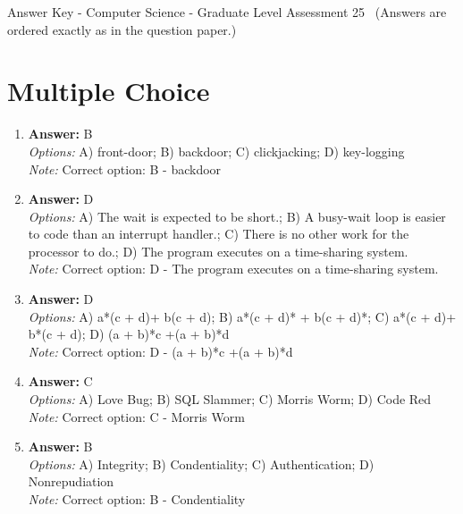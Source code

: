 \documentclass[12pt]{article}
\begin{document}
\begin{center}
Answer Key - Computer Science - Graduate Level Assessment 25 \
\small (Answers are ordered exactly as in the question paper.)
\end{center}

\section*{Multiple Choice}
\begin{enumerate}[label=\arabic*.]
\item \textbf{Answer:} B
\\ \textit{Options:} A) front-door; B) backdoor; C) clickjacking; D) key-logging
\\ \textit{Note:} Correct option: B - backdoor
\item \textbf{Answer:} D
\\ \textit{Options:} A) The wait is expected to be short.; B) A busy-wait loop is easier to code than an interrupt handler.; C) There is no other work for the processor to do.; D) The program executes on a time-sharing system.
\\ \textit{Note:} Correct option: D - The program executes on a time-sharing system.
\item \textbf{Answer:} D
\\ \textit{Options:} A) a*(c + d)+ b(c + d); B) a*(c + d)* + b(c + d)*; C) a*(c + d)+ b*(c + d); D) (a + b)*c +(a + b)*d
\\ \textit{Note:} Correct option: D - (a + b)*c +(a + b)*d
\item \textbf{Answer:} C
\\ \textit{Options:} A) Love Bug; B) SQL Slammer; C) Morris Worm; D) Code Red
\\ \textit{Note:} Correct option: C - Morris Worm
\item \textbf{Answer:} B
\\ \textit{Options:} A) Integrity; B) Condentiality; C) Authentication; D) Nonrepudiation
\\ \textit{Note:} Correct option: B - Condentiality
\end{enumerate}
\end{document}
